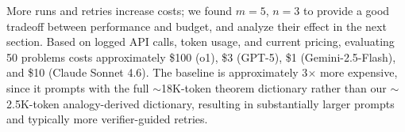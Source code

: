 More runs and retries increase costs; we found $m=5$, $n=3$ to provide a good tradeoff between performance and budget, and analyze their effect in the next section.
Based on logged API calls, token usage, and current pricing, evaluating 50 problems costs approximately \$100 (o1), \$3 (GPT-5), \$1 (Gemini-2.5-Flash), and \$10 (Claude Sonnet 4.6). The baseline is approximately 3$\times$ more expensive, since it prompts with the full $\sim$18K-token theorem dictionary rather than our $\sim$2.5K-token analogy-derived dictionary, resulting in substantially larger prompts and typically more verifier-guided retries.



